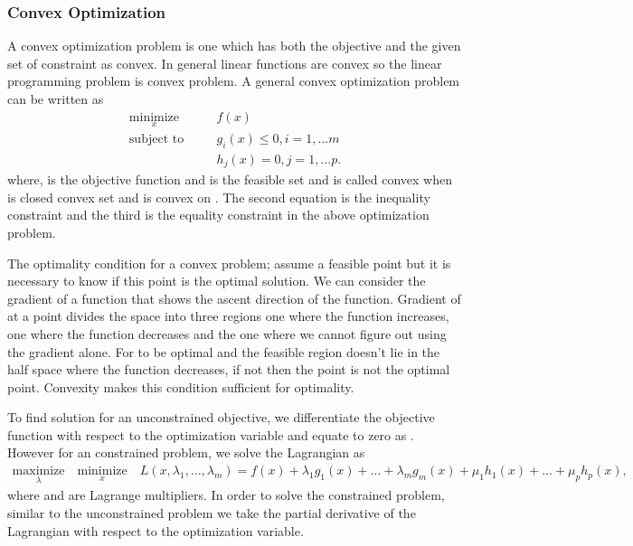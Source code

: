 \subsubsection{Convex Optimization}

A convex optimization problem is one which has both the objective and the given set of constraint as convex. In general linear functions are convex so the linear programming problem is convex problem. A general convex optimization problem can be written as
\begin{eqnarray}
\underset{x}{\text{minimize}} \quad && f(x) \\
\text{subject to} \quad && g_i(x) \leq 0, i = 1,...m\\
&& h_j(x) = 0, j = 1,...p.
\end{eqnarray}
where,  is the objective function and  \me{\subset}  is the feasible set and is called convex when  is closed convex set and  is convex on . The second equation is the inequality constraint and the third is the equality constraint in the above optimization problem.
\par
The optimality condition for a convex problem; assume a feasible point  but it is necessary to know if this point is the optimal solution. We can consider the gradient of a function  that shows the ascent direction of the function. Gradient of  at a point  divides the space into three regions one where the function increases, one where the function decreases and the one where we cannot figure out using the gradient alone. For  to be optimal and the feasible region doesn't lie in the half space where the function decreases, if not then the point  is not the optimal point. Convexity makes this condition sufficient for optimality. 
\par
To find solution for an unconstrained objective, we differentiate the objective function with respect to the optimization variable  and equate to zero as . However for an constrained problem, we solve the Lagrangian as
\begin{eqnarray}
\underset{\lambda}{\text{maximize}} \quad \underset{x}{\text{minimize}} \quad  L(x,\lambda_1, \dotsc,\lambda_m) =  f(x) + \lambda_1 g_1(x) + \dotsc + \lambda_m g_m(x) + \mu_1 h_1 (x) + \dotsc + \mu_p h_p(x),
\end{eqnarray}
where  and  are Lagrange multipliers. In order to solve the constrained problem, similar to the unconstrained problem we take the partial derivative of the Lagrangian with respect to the optimization variable.
